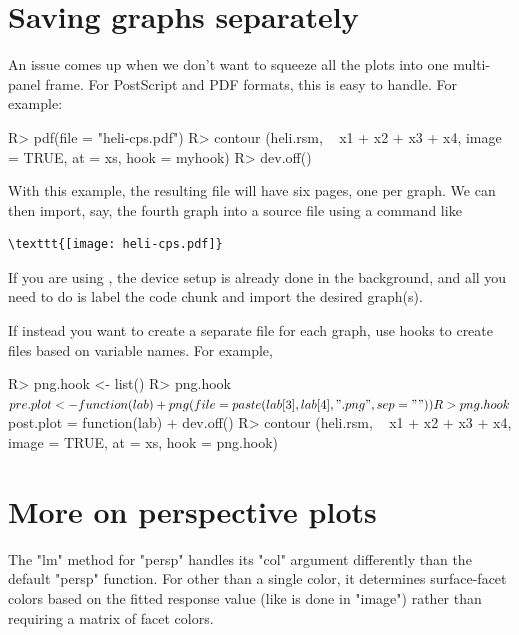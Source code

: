 \documentclass[article,nojss]{jss}
\begin{document}
\section{Saving graphs separately}
An issue comes up when we don't want to squeeze all the plots into one multi-panel frame.  For PostScript and PDF formats, this is easy to handle.  For example:
\begin{Schunk}
\begin{Sinput}
R> pdf(file = "heli-cps.pdf")
R> contour (heli.rsm, ~ x1 + x2 + x3 + x4, image = TRUE, at = xs, hook = myhook)
R> dev.off()
\end{Sinput}
\end{Schunk}
With this example, the resulting file will have six pages, one per graph.  We can then import, say, the fourth graph into a  source file using a command like
\begin{verbatim}
\texttt{[image: heli-cps.pdf]}
\end{verbatim}
If you are using , the device setup is already done in the background, and all you need to do is label the code chunk and import the desired graph(s).


If instead you want to create a separate file for each graph, use hooks to create files based on variable names.  For example,
\begin{Schunk}
\begin{Sinput}
R> png.hook <- list()
R> png.hook$pre.plot <- function(lab) 
+     png(file = paste(lab[3], lab[4], ".png", sep = ""))
R> png.hook$post.plot = function(lab)
+     dev.off()
R> contour (heli.rsm, ~ x1 + x2 + x3 + x4, image = TRUE, at = xs, hook = png.hook)
\end{Sinput}
\end{Schunk}

\section{More on perspective plots}
The "lm" method for "persp" handles its "col" argument differently than the default "persp" function.  For other than a single color, it determines surface-facet colors based on the fitted response value (like is done in "image") rather than requiring a matrix of facet colors.
\end{document}

